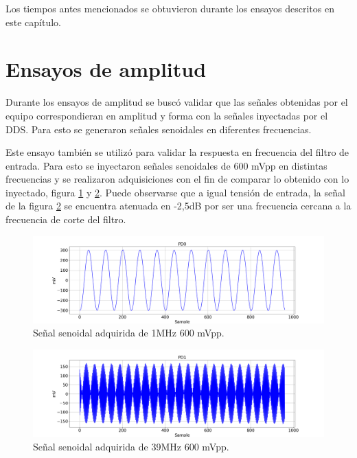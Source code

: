\vspace{5mm}

Los tiempos antes mencionados se obtuvieron durante los ensayos descritos en este capítulo.



\section{Ensayos de amplitud}
Durante los ensayos de amplitud se buscó validar que las señales obtenidas por el equipo correspondieran en amplitud y forma con la señales inyectadas por el DDS. Para esto se generaron señales senoidales en diferentes frecuencias.

Este ensayo también se utilizó para validar la respuesta en frecuencia del filtro de entrada. Para esto se inyectaron señales senoidales de 600 mVpp en distintas frecuencias y se realizaron adquisiciones con el fin de comparar lo obtenido con lo inyectado, figura \ref{fig:sin1} y \ref{fig:sin39}. Puede observarse que a igual tensión de entrada, la señal de la figura \ref{fig:sin39} se encuentra atenuada en -2,5dB por ser una frecuencia cercana a la frecuencia de corte del filtro. 

\newpage

\begin{figure}[htpb]
	\hspace{-1.2cm}
	\includegraphics[width=165mm]{./Figures/sin1.png}
	\caption{Señal senoidal adquirida de 1MHz 600 mVpp.}
	\label{fig:sin1}
\end{figure}

\begin{figure}[htpb]
	\hspace{-1.2cm}
	\includegraphics[width=165mm]{./Figures/sin39.png}
	\caption{Señal senoidal adquirida de 39MHz 600 mVpp.}
	\label{fig:sin39}
\end{figure}

